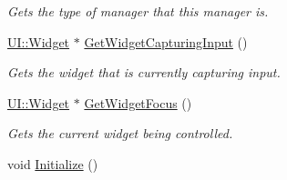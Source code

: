 \begin{DoxyCompactItemize}
\begin{DoxyCompactList}\small\item\em Gets the type of manager that this manager is. \item\end{DoxyCompactList}\item 
\hyperlink{classphys_1_1UI_1_1Widget}{UI::Widget} $\ast$ \hyperlink{classphys_1_1UIManager_ad686b75d17ac2f674a9aa2dd0e097030}{GetWidgetCapturingInput} ()
\begin{DoxyCompactList}\small\item\em Gets the widget that is currently capturing input. \item\end{DoxyCompactList}\item 
\hyperlink{classphys_1_1UI_1_1Widget}{UI::Widget} $\ast$ \hyperlink{classphys_1_1UIManager_a99694297814d2e82ec507c6f4d6bec1a}{GetWidgetFocus} ()
\begin{DoxyCompactList}\small\item\em Gets the current widget being controlled. \item\end{DoxyCompactList}\item 
\hypertarget{classphys_1_1UIManager_af04e60c4f09c114ec3bf32babdb64ab7}{
void \hyperlink{classphys_1_1UIManager_af04e60c4f09c114ec3bf32babdb64ab7}{Initialize} ()}
\label{classphys_1_1UIManager_af04e60c4f09c114ec3bf32babdb64ab7}


\end{DoxyCompactItemize}
